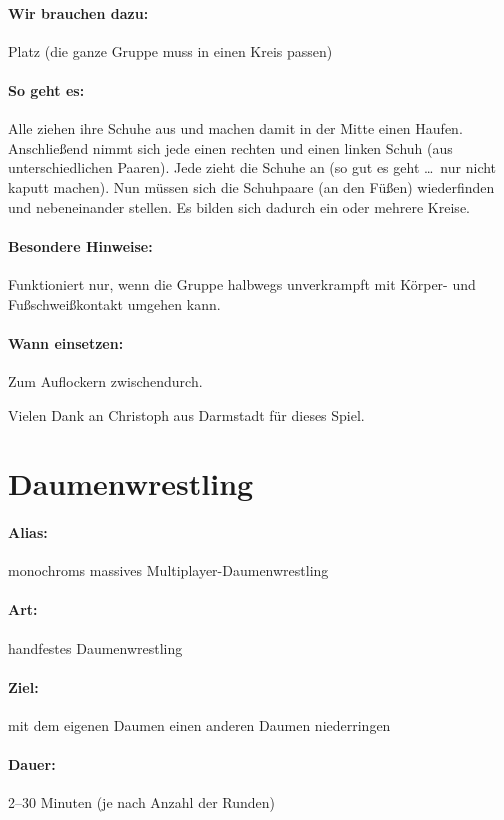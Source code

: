\paragraph{Wir brauchen dazu:} Platz (die ganze Gruppe muss in einen Kreis passen)
\paragraph{So geht es:} Alle ziehen ihre Schuhe aus und machen damit in der Mitte einen Haufen. Anschließend nimmt sich jede einen rechten und einen linken Schuh (aus unterschiedlichen Paaren). Jede zieht die Schuhe an (so gut es geht \ldots\ nur nicht kaputt machen). Nun müssen sich die Schuhpaare (an den Füßen) wiederfinden und nebeneinander stellen. Es bilden sich dadurch ein oder mehrere Kreise.
\paragraph{Besondere Hinweise:} Funktioniert nur, wenn die Gruppe halbwegs unverkrampft mit Körper- und Fußschweißkontakt umgehen kann.
\paragraph{Wann einsetzen:} Zum Auflockern zwischendurch.

Vielen Dank an Christoph aus Darmstadt für dieses Spiel.


\section{Daumenwrestling}
\paragraph{Alias:} monochroms massives Multiplayer-Daumenwrestling
\paragraph{Art:} handfestes Daumenwrestling
\paragraph{Ziel:} mit dem eigenen Daumen einen anderen Daumen niederringen
\paragraph{Dauer:} 2--30 Minuten (je nach Anzahl der Runden)
